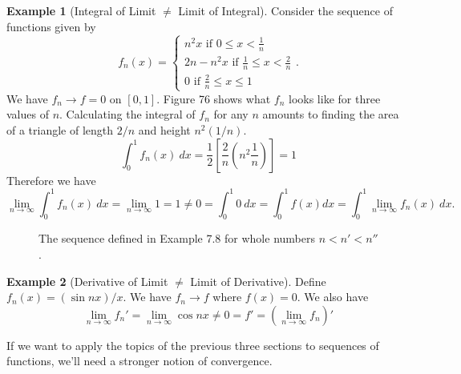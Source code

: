 \documentclass{article}
\newcommand{\R}{\mathbb{R}}
\theoremstyle{definition}
\newtheorem{example}{Example}[section]
\begin{document}
	\begin{example}[Integral of Limit $ \neq $ Limit of Integral]
		Consider the sequence of functions given by $$ f_n(x)=\begin{cases}
			n^2x\text{ if } 0\le x<\frac{1}{n}\\
			2n-n^2x\text{ if } \frac{1}{n}\le x <\frac{2}{n}\\
			0\text{ if } \frac{2}{n}\le x\le 1
		\end{cases}.$$ We have $ f_n\to f=0 $ on $ [0,1] $. Figure 76 shows what $ f_n $ looks like for three values of $ n $. Calculating the integral of $ f_n $ for any $ n $ amounts to finding the area of a triangle of length $ 2/n $ and height $ n^2(1/n) $. $$ \int_{0}^1f_n(x)\ dx=\frac{1}{2}\left[\frac{2}{n}\left(n^2\frac{1}{n}\right)\right]=1 $$ Therefore we have $$\lim\limits_{n\to\infty}\int_{0}^{1}f_n(x)\ dx=\lim\limits_{n\to\infty}1=1\neq 0=\int_{0}^{1}0\ dx=\int_{0}^{1} f(x) dx=\int_{0}^{1}\lim\limits_{n\to\infty} f_n(x)\ dx.$$
		\begin{figure}[h!]
			\centering
			\caption{The sequence defined in Example 7.8 for whole numbers $ n<n'<n'' $. }
		\end{figure}
		
	\end{example} 
	\begin{example}[Derivative of Limit $ \neq $ Limit of Derivative]
		Define $ f_n(x)=(\sin nx) / x $. We have $f_n\to f$ where $ f(x)=0 $. We also have $$ \lim\limits_{n\to\infty}f_n'=\lim\limits_{n\to\infty}\cos nx\neq 0=f'=\left(\lim\limits_{n\to\infty}f_n\right)'$$
	\end{example}
	If we want to apply the topics of the previous three sections to sequences of functions, we'll need a stronger notion of convergence.  
\end{document}
